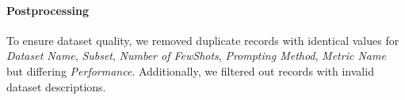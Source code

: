 \paragraph{Postprocessing} 

To ensure dataset quality, we removed duplicate records with identical values for \textit{Dataset Name}, \textit{Subset}, \textit{Number of Few\-Shots}, \textit{Prompting Method}, \textit{Metric Name} but differing \textit{Performance}. 
Additionally, we filtered out records with invalid dataset descriptions.




